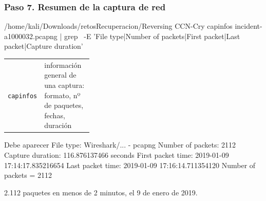 \documentclass[11pt,a4paper]{article}
\begin{document}
\subsubsection*{Paso 7. Resumen de la captura de red}
\begin{comando}{/home/kali/Downloads/retosRecuperacion/Reversing CCN-Cry}
capinfos incident-a1000032.pcapng | grep \
  -E 'File type|Number of packets|First packet|Last packet|Capture duration'
\end{comando}
\begin{tcolorbox}[enhanced, breakable, colback=gray!3, colframe=gray!35, boxrule=0.3pt, arc=1pt, left=4pt, right=4pt, top=2pt, bottom=2pt, fonttitle=\sffamily\scriptsize\bfseries, coltitle=black!70, colbacktitle=gray!10, title={Qué hace cada parte}, attach title to upper, before skip=2pt, after skip=4pt, fontupper=\small]
\par{\renewcommand{\arraystretch}{1.12}\begin{tabularx}{\linewidth}{@{}>{\raggedright\arraybackslash}p{0.33\linewidth}>{\raggedright\arraybackslash}X@{}}
\texttt{capinfos} & información general de una captura: formato, nº de paquetes, fechas, duración \\
\end{tabularx}}
\end{tcolorbox}
\begin{salida}{Debe aparecer}
File type:           Wireshark/... - pcapng
Number of packets:   2112
Capture duration:    116.876137466 seconds
First packet time:   2019-01-09 17:14:17.835216654
Last packet time:    2019-01-09 17:16:14.711354120
                     Number of packets = 2112
\end{salida}
\begin{nota}2.112 paquetes en menos de 2 minutos, el 9 de enero de 2019.\end{nota}
\end{document}
